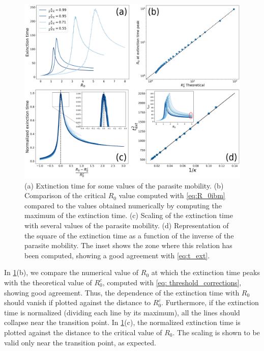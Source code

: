 \begin{figure}[H]
    \centering
    \includegraphics[width=\textwidth]{Figures/Extinction_time.png}
    \caption[Analysis of the extinction time of the epidemic]{(a) Extinction
        time for some values of the parasite mobility. (b) Comparison of the
        critical $R_0$ value computed with \cref{eq:R_0ibm} compared to the
        values obtained numerically by computing the maximum of the extinction
        time. (c) Scaling of the extinction time with several values of the
        parasite mobility. (d) Representation of the square of the extinction
        time as a function of the inverse of the parasite mobility. The inset
        shows the zone where this relation has been computed, showing a good
        agreement with \cref{eq:t_ext}.}
    \label{fig:extinction_time}
\end{figure}

In \cref{fig:extinction_time}(b), we compare the numerical value of $R_0$ at
which the extinction time peaks with the theoretical value of $R_0^c$, computed
with \cref{eq: threshold_corrections}, showing good agreement. Thus, the
dependence of the extinction time with $R_0$ should vanish if plotted against
the distance to $R_0^c$. Furthermore, if the extinction time is normalized
(dividing each line by its maximum), all the lines should collapse near the
transition point. In \cref{fig:extinction_time}(c), the normalized extinction
time is plotted against the distance to the critical value of $R_0$. The
scaling is shown to be valid only near the transition point, as expected.

